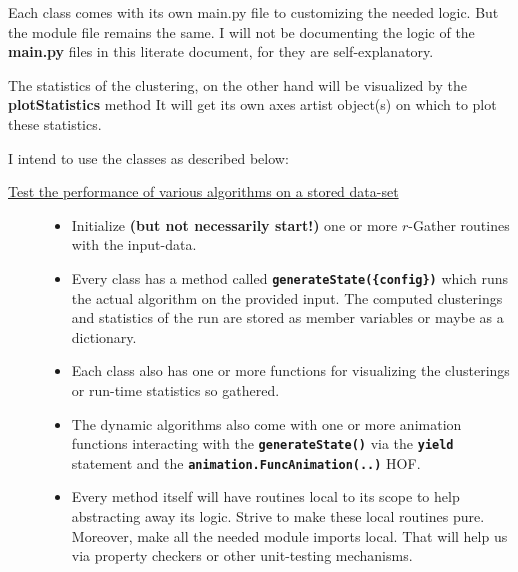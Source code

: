 \documentclass[11pt]{article}
\begin{document}
Each class comes with its own  main.py   
file to customizing the needed logic. But the module file remains the same. I will not be documenting the 
logic of the \textbf{main.py} files in this literate document, for they are self-explanatory. 

The statistics of the clustering, on the other hand will be visualized by the \textbf{plotStatistics} method 
It will get its own axes artist object(s) on which to plot these statistics. 

I intend to use the classes as described below:

\begin{description}
\item[{\uline{Test the performance of various algorithms on a stored data-set}}] \begin{itemize}
\item Initialize \textbf{(but not necessarily start!)} one or more $r$-Gather routines with the input-data.
\item Every class has a method called \textbf{\verb~generateState({config})~} which runs the actual
algorithm on the provided input. The computed clusterings and statistics of the 
run are stored as member variables or maybe as a dictionary.
\item Each class also has one or more functions for visualizing the clusterings or 
run-time statistics so gathered.
\item The dynamic algorithms also come with one or more animation functions  
interacting with the \textbf{\verb~generateState()~} via the \textbf{\verb~yield~} statement and the 
\textbf{\verb~animation.FuncAnimation(..)~} HOF.
\item Every method itself will have routines local to its scope to help abstracting away its logic. 
Strive to make these local routines pure. Moreover, make all the needed module imports local.  
That will help us via property checkers or other unit-testing mechanisms.
\end{itemize}
\end{description}
\end{document}
